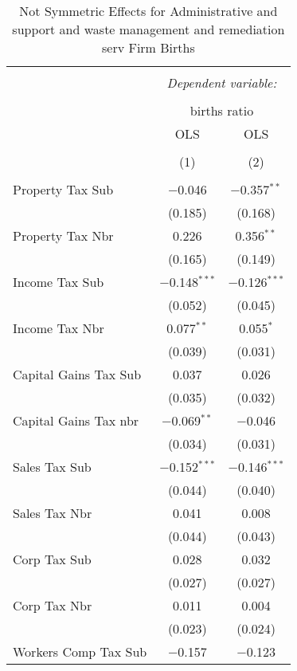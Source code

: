 
\begin{table}[!htbp] \centering 
  \caption{Not Symmetric Effects for  Administrative and support and waste management and remediation serv Firm Births} 
  \label{} 
\begin{tabular}{@{\extracolsep{5pt}}lcc} 
\\[-1.8ex]\hline 
\hline \\[-1.8ex] 
 & \multicolumn{2}{c}{\textit{Dependent variable:}} \\ 
\cline{2-3} 
\\[-1.8ex] & \multicolumn{2}{c}{births ratio} \\ 
 & OLS & OLS \\ 
\\[-1.8ex] & (1) & (2)\\ 
\hline \\[-1.8ex] 
 Property Tax Sub & $-$0.046 & $-$0.357$^{**}$ \\ 
  & (0.185) & (0.168) \\ 
  Property Tax Nbr & 0.226 & 0.356$^{**}$ \\ 
  & (0.165) & (0.149) \\ 
  Income Tax Sub & $-$0.148$^{***}$ & $-$0.126$^{***}$ \\ 
  & (0.052) & (0.045) \\ 
  Income Tax Nbr & 0.077$^{**}$ & 0.055$^{*}$ \\ 
  & (0.039) & (0.031) \\ 
  Capital Gains Tax Sub & 0.037 & 0.026 \\ 
  & (0.035) & (0.032) \\ 
  Capital Gains Tax nbr & $-$0.069$^{**}$ & $-$0.046 \\ 
  & (0.034) & (0.031) \\ 
  Sales Tax Sub & $-$0.152$^{***}$ & $-$0.146$^{***}$ \\ 
  & (0.044) & (0.040) \\ 
  Sales Tax Nbr & 0.041 & 0.008 \\ 
  & (0.044) & (0.043) \\ 
  Corp Tax Sub & 0.028 & 0.032 \\ 
  & (0.027) & (0.027) \\ 
  Corp Tax Nbr & 0.011 & 0.004 \\ 
  & (0.023) & (0.024) \\ 
  Workers Comp Tax Sub & $-$0.157 & $-$0.123 \\ 

\end{tabular}
\end{table}
